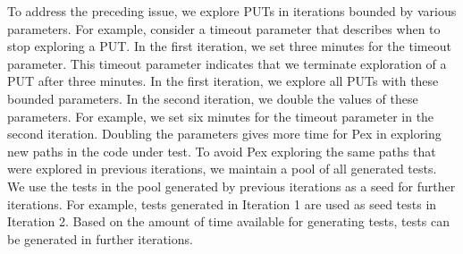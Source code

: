 To address the preceding issue, we explore PUTs in iterations bounded by various parameters. For example, consider a timeout parameter that describes when to stop exploring a PUT. In the first iteration, we set three minutes for the timeout parameter. This timeout parameter indicates that we terminate exploration of a PUT after three minutes. In the first iteration, we explore all PUTs with these bounded parameters. In the second iteration, we double the values of these parameters. For example, we set six minutes for the timeout parameter in the second iteration. Doubling the parameters gives more time for Pex in exploring new paths in the code under test. To avoid Pex exploring the same paths that were explored in previous iterations, we maintain a pool of all generated tests. We use the tests in the pool generated by previous iterations as a seed for further iterations. For example, tests generated in Iteration 1 are used as seed tests in Iteration 2. Based on the amount of time available for generating tests, tests can be generated in further iterations.
